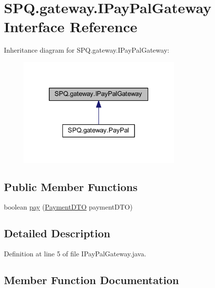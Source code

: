 \hypertarget{interface_s_p_q_1_1gateway_1_1_i_pay_pal_gateway}{}\section{S\+P\+Q.\+gateway.\+I\+Pay\+Pal\+Gateway Interface Reference}
\label{interface_s_p_q_1_1gateway_1_1_i_pay_pal_gateway}


Inheritance diagram for S\+P\+Q.\+gateway.\+I\+Pay\+Pal\+Gateway\+:\nopagebreak
\begin{figure}[H]
\begin{center}
\leavevmode
\includegraphics[width=232pt]{interface_s_p_q_1_1gateway_1_1_i_pay_pal_gateway__inherit__graph}
\end{center}
\end{figure}
\subsection*{Public Member Functions}
\begin{DoxyCompactItemize}
\item 
boolean \mbox{\hyperlink{interface_s_p_q_1_1gateway_1_1_i_pay_pal_gateway_a064ef641b0db9c4a6d0de59089a108bf}{pay}} (\mbox{\hyperlink{class_s_p_q_1_1dto_1_1_payment_d_t_o}{Payment\+D\+TO}} payment\+D\+TO)
\end{DoxyCompactItemize}


\subsection{Detailed Description}


Definition at line 5 of file I\+Pay\+Pal\+Gateway.\+java.



\subsection{Member Function Documentation}
\mbox{\label{interface_s_p_q_1_1gateway_1_1_i_pay_pal_gateway_a064ef641b0db9c4a6d0de59089a108bf}} 
